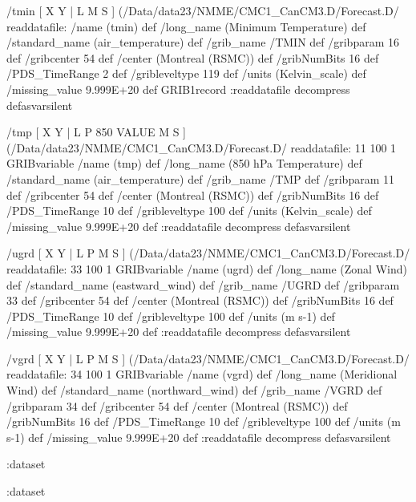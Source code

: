\begin{ingrid}
/tmin {
[ X Y | L M S ] (/Data/data23/NMME/CMC1_CanCM3.D/Forecast.D/%
readdatafile: 
/name (tmin) def
/long_name (Minimum Temperature) def
/standard_name (air_temperature) def
/grib_name /TMIN def
/gribparam 16 def
/gribcenter 54 def
/center (Montreal (RSMC)) def
/gribNumBits 16 def
/PDS_TimeRange 2 def
/gribleveltype 119 def
/units (Kelvin_scale) def
/missing_value 9.999E+20 def
GRIB1record
:readdatafile decompress
} defasvarsilent

/tmp {
[ X Y | L P 850 VALUE M S ] (/Data/data23/NMME/CMC1_CanCM3.D/Forecast.D/%
readdatafile: 
11 100 1 GRIBvariable
/name (tmp) def
/long_name (850 hPa Temperature) def
/standard_name (air_temperature) def
/grib_name /TMP def
/gribparam 11 def
/gribcenter 54 def
/center (Montreal (RSMC)) def
/gribNumBits 16 def
/PDS_TimeRange 10 def
/gribleveltype 100 def
/units (Kelvin_scale) def
/missing_value 9.999E+20 def
:readdatafile decompress
} defasvarsilent

/ugrd {
[ X Y | L P M S ] (/Data/data23/NMME/CMC1_CanCM3.D/Forecast.D/%
readdatafile:
33 100 1 GRIBvariable 
/name (ugrd) def
/long_name (Zonal Wind) def
/standard_name (eastward_wind) def
/grib_name /UGRD def
/gribparam 33 def
/gribcenter 54 def
/center (Montreal (RSMC)) def
/gribNumBits 16 def
/PDS_TimeRange 10 def
/gribleveltype 100 def
/units (m s-1) def
/missing_value 9.999E+20 def
:readdatafile decompress
} defasvarsilent

/vgrd {
[ X Y | L P M S ] (/Data/data23/NMME/CMC1_CanCM3.D/Forecast.D/%
readdatafile:
34 100 1 GRIBvariable 
/name (vgrd) def
/long_name (Meridional Wind) def
/standard_name (northward_wind) def
/grib_name /VGRD def
/gribparam 34 def
/gribcenter 54 def
/center (Montreal (RSMC)) def
/gribNumBits 16 def
/PDS_TimeRange 10 def
/gribleveltype 100 def
/units (m s-1) def
/missing_value 9.999E+20 def
:readdatafile decompress
} defasvarsilent

:dataset

:dataset
\end{ingrid}
